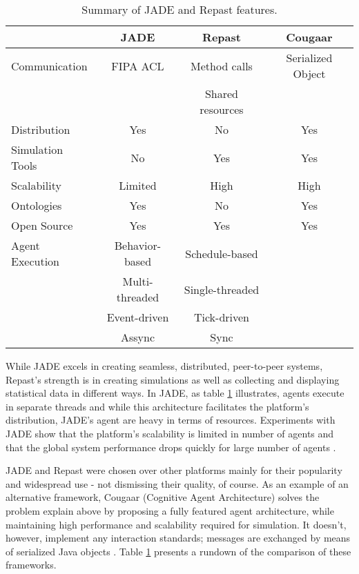\begin{table}[tb]
	\caption{Summary of JADE and Repast features.}
	\label{tab:jadevsrep}
	\begin{center}
		\begin{tabular}{l|ccc}
		\hline

		\hline
		\textbf{} & \textbf{JADE} & \textbf{Repast} & \textbf{Cougaar} \\
		\hline
			Communication & FIPA ACL &  Method calls  & Serialized Object \\
						  &			 &  Shared resources \\
		\hline
			Distribution & Yes & No & Yes \\
		\hline
			Simulation Tools & No & Yes & Yes \\
		\hline
			Scalability & Limited & High & High \\
		\hline
			Ontologies & Yes & No & Yes\\
		\hline
			Open Source & Yes & Yes & Yes\\
		\hline
			Agent Execution & Behavior-based & Schedule-based  &  \\
							& Multi-threaded & Single-threaded &  \\
							& Event-driven   & Tick-driven 	   &  \\
							& Assync		 & Sync 		   &  \\
		\hline
		\end{tabular}
	\end{center}
\end{table}

While JADE excels in creating seamless, distributed, peer-to-peer systems,
Repast's strength is in creating simulations as well as collecting and displaying statistical data in different ways. In JADE, as table \ref{tab:jadevsrep} illustrates, agents execute in separate threads and while this architecture facilitates the platform's distribution, JADE's agent are heavy in terms of resources. Experiments with JADE show that the platform's scalability is limited in number of agents and that the global system performance drops quickly for large number of agents \cite{mengistu2008scalability} \cite{garcia2011misia}.

JADE and Repast were chosen over other platforms mainly for their popularity and widespread use - not dismissing their quality, of course. As an example of an alternative framework, Cougaar (Cognitive Agent Architecture) solves the problem explain above by proposing a fully featured agent architecture, while maintaining high performance and scalability required for simulation. It doesn't, however, implement any interaction standards; messages are exchanged by means of serialized Java objects \cite{helsinger2004cougaar}. Table \ref{tab:jadevsrep} presents a rundown of the comparison of these frameworks.



